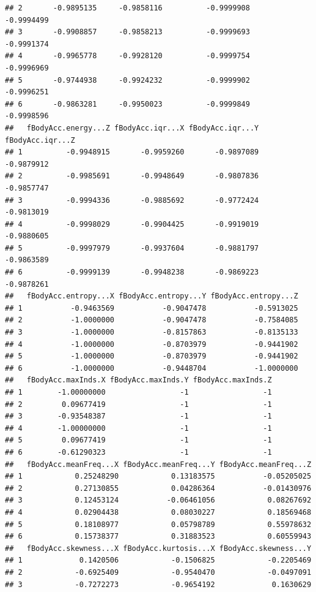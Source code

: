 \documentclass[
]{article}
\begin{document}
\begin{verbatim}
## 2       -0.9895135     -0.9858116          -0.9999908          -0.9994499
## 3       -0.9908857     -0.9858213          -0.9999693          -0.9991374
## 4       -0.9965778     -0.9928120          -0.9999754          -0.9996969
## 5       -0.9744938     -0.9924232          -0.9999902          -0.9996251
## 6       -0.9863281     -0.9950023          -0.9999849          -0.9998596
##   fBodyAcc.energy...Z fBodyAcc.iqr...X fBodyAcc.iqr...Y fBodyAcc.iqr...Z
## 1          -0.9948915       -0.9959260       -0.9897089       -0.9879912
## 2          -0.9985691       -0.9948649       -0.9807836       -0.9857747
## 3          -0.9994336       -0.9885692       -0.9772424       -0.9813019
## 4          -0.9998029       -0.9904425       -0.9919019       -0.9880605
## 5          -0.9997979       -0.9937604       -0.9881797       -0.9863589
## 6          -0.9999139       -0.9948238       -0.9869223       -0.9878261
##   fBodyAcc.entropy...X fBodyAcc.entropy...Y fBodyAcc.entropy...Z
## 1           -0.9463569           -0.9047478           -0.5913025
## 2           -1.0000000           -0.9047478           -0.7584085
## 3           -1.0000000           -0.8157863           -0.8135133
## 4           -1.0000000           -0.8703979           -0.9441902
## 5           -1.0000000           -0.8703979           -0.9441902
## 6           -1.0000000           -0.9448704           -1.0000000
##   fBodyAcc.maxInds.X fBodyAcc.maxInds.Y fBodyAcc.maxInds.Z
## 1        -1.00000000                 -1                 -1
## 2         0.09677419                 -1                 -1
## 3        -0.93548387                 -1                 -1
## 4        -1.00000000                 -1                 -1
## 5         0.09677419                 -1                 -1
## 6        -0.61290323                 -1                 -1
##   fBodyAcc.meanFreq...X fBodyAcc.meanFreq...Y fBodyAcc.meanFreq...Z
## 1            0.25248290            0.13183575           -0.05205025
## 2            0.27130855            0.04286364           -0.01430976
## 3            0.12453124           -0.06461056            0.08267692
## 4            0.02904438            0.08030227            0.18569468
## 5            0.18108977            0.05798789            0.55978632
## 6            0.15738377            0.31883523            0.60559943
##   fBodyAcc.skewness...X fBodyAcc.kurtosis...X fBodyAcc.skewness...Y
## 1             0.1420506            -0.1506825            -0.2205469
## 2            -0.6925409            -0.9540470            -0.0497091
## 3            -0.7272273            -0.9654192             0.1630629

\end{verbatim}
\end{document}
